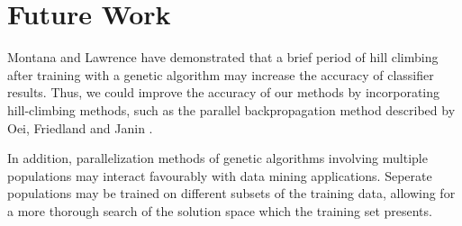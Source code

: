 \documentclass[11pt]{article}       %
\begin{document}
\section{Future Work} \label{future}
Montana and Lawrence \cite{GA-ANN} have demonstrated that a brief period of hill climbing after training with a genetic algorithm may increase the accuracy of classifier results. Thus, we could improve the accuracy of our methods by incorporating hill-climbing methods, such as the parallel backpropagation method described by Oei, Friedland and Janin \cite{backprop}.

In addition, parallelization methods of genetic algorithms involving multiple populations \cite{Alba1999} may interact favourably with data mining applications.  Seperate populations may be trained on different subsets of the training data, allowing for a more thorough search of the solution space which the training set presents.



\end{document}
